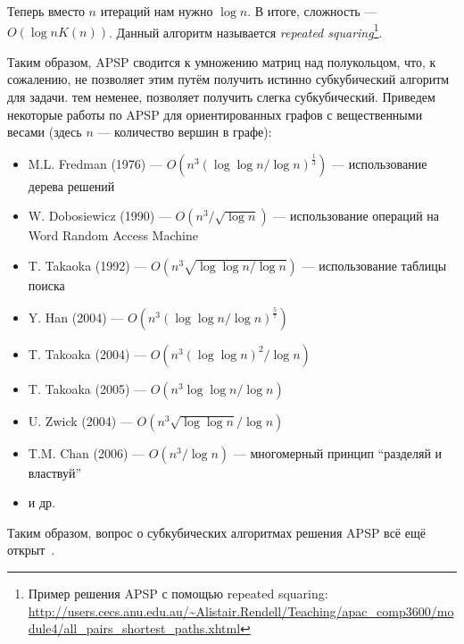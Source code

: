 Теперь вместо $n$ итераций нам нужно $\log{n}$. В итоге, сложность --- $O(\log{n} K(n))$.
Данный алгоритм называется \textit{repeated squaring}\footnote{Пример решения APSP с помощью repeated squaring: \url{http://users.cecs.anu.edu.au/~Alistair.Rendell/Teaching/apac_comp3600/module4/all_pairs_shortest_paths.xhtml}}.


Таким образом, APSP сводится к умножению матриц над полукольцом, что, к сожалению, не позволяет этим путём получить истинно субкубический алгоритм для задачи. тем неменее, позволяет получить слегка субкубический. Приведем некоторые работы по APSP для ориентированных графов с вещественными весами (здесь $n$ --- количество вершин в графе):
\begin{itemize}
    \item M.L. Fredman (1976) --- $O(n^3(\log \log n / \log n)^\frac{1}{3})$ --- использование дерева решений~\cite{FredmanAPSP1976}
    \item W. Dobosiewicz (1990) --- $O(n^3 / \sqrt{\log n})$ --- использование операций на Word Random Access Machine~\cite{Dobosiewicz1990}
    \item T. Takaoka (1992) --- $O(n^3 \sqrt{\log \log n / \log n})$ --- использование таблицы поиска~\cite{Takaoka1992}
    \item Y. Han (2004) --- $O(n^3 (\log \log n / \log n)^\frac{5}{7})$~\cite{Han2004}
    \item T. Takoaka (2004) --- $O(n^3 (\log \log n)^2 / \log n)$~\cite{Takaoka2004}
    \item T. Takoaka (2005) --- $O(n^3 \log \log n / \log n)$~\cite{Takaoka2005}
    \item U. Zwick (2004) --- $O(n^3 \sqrt{\log \log n} / \log n)$~\cite{Zwick2004}
    \item T.M. Chan (2006) --- $O(n^3 / \log n)$ --- многомерный принцип ``разделяй и властвуй''~\cite{Chan2008}
    \item и др.
\end{itemize}

Таким образом, вопрос о субкубических алгоритмах решения APSP всё ещё открыт~\cite{Chan2010}.




